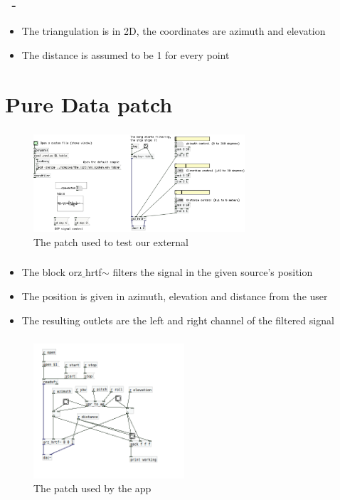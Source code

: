 \documentclass{beamer}
\begin{document}
	\begin{frame}
		\frametitle{\insertsection\ - \insertsubsection}
		\begin{itemize}
			\item The triangulation is in 2D, the coordinates are azimuth and elevation
			\item The distance is assumed to be 1 for every point
		\end{itemize}
	\end{frame}

	\section{Pure Data patch}

	\begin{frame}
		\frametitle{\insertsection}
		\begin{figure}
			\centering
			  \includegraphics[width=0.7\textwidth]{images/Test_patch.png}
			  \caption{The patch used to test our external}
			  \label{fig:test}
		\end{figure}
	\end{frame}
	
	\begin{frame}
		\frametitle{\insertsection}
		\begin{itemize}
			\item The block orz$\_$hrtf$\sim$ filters the signal in the given source's position
			\item The position is given in azimuth, elevation and distance from the user
			\item The resulting outlets are the left and right channel of the filtered signal
		\end{itemize}
	\end{frame}

	\begin{frame}
		\frametitle{\insertsection}
		\begin{figure}
			\centering
			  \includegraphics[width=0.5\textwidth]{images/iOS_patch.png}
			  \caption{The patch used by the app}
			  \label{fig:ios_pd}
		\end{figure}
	\end{frame}
\end{document}

